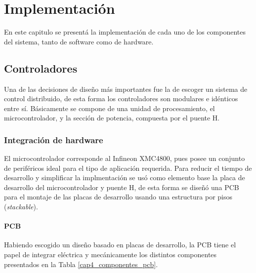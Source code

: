 \chapter{Implementación}

En este capitulo se presentá la implementación de cada uno de los componentes del sistema, tanto de software como de hardware.

\section{Controladores}

Una de las decisiones de diseño más importantes fue la de escoger un sistema de control distribuido, de esta forma los controladores son modulares e idénticos entre sí. Básicamente se compone de una unidad de procesamiento, el microcontrolador, y la sección de potencia, compuesta por el puente H.

\subsection{Integración de hardware}

El microcontrolador corresponde al Infineon XMC4800, pues posee un conjunto de periféricos ideal para el tipo de aplicación requerida. Para reducir el tiempo de desarrollo y simplificar la implmentación se usó como elemento base la placa de desarrollo del microcontrolador y puente H, de esta forma se diseñó una PCB para el montaje de las placas de desarrollo usando una estructura por pisos (\textit{stackable}).

\subsubsection{PCB}

Habiendo escogido un diseño basado en placas de desarrollo, la PCB tiene el papel de integrar eléctrica y mecánicamente los distintos componentes presentados en la Tabla \ref{cap4_componentes_pcb}.

